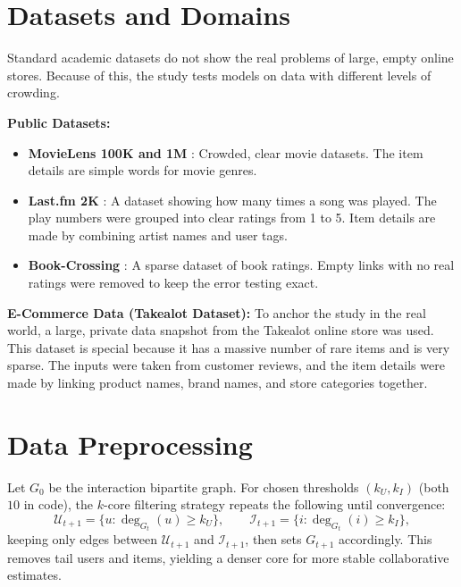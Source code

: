 \documentclass[11pt,a4paper]{report}
\begin{document}
\section{Datasets and Domains}
Standard academic datasets do not show the real problems of large, empty online stores. Because of this, the study tests models on data with different levels of crowding.

\textbf{Public Datasets:}
\begin{itemize}
    \item \textbf{MovieLens 100K and 1M} \citep{harper2015movielens}: Crowded, clear movie datasets. The item details are simple words for movie genres.
    \item \textbf{Last.fm 2K} \citep{cantador2011second}: A dataset showing how many times a song was played. The play numbers were grouped into clear ratings from 1 to 5. Item details are made by combining artist names and user tags.
    \item \textbf{Book-Crossing} \citep{ziegler2005improving}: A sparse dataset of book ratings. Empty links with no real ratings were removed to keep the error testing exact.
\end{itemize}

\textbf{E-Commerce Data (Takealot Dataset):}
To anchor the study in the real world, a large, private data snapshot from the Takealot online store was used. This dataset is special because it has a massive number of rare items and is very sparse. The inputs were taken from customer reviews, and the item details were made by linking product names, brand names, and store categories together.

\section{Data Preprocessing}
Let $G_0$ be the interaction bipartite graph. For chosen thresholds $(k_U,k_I)$ (both $10$ in code), the $k$-core filtering strategy repeats the following until convergence:
\begin{equation}
  \mathcal{U}_{t+1} = \bigl\{ u : \deg_{G_t}(u) \ge k_U \bigr\}, \qquad
  \mathcal{I}_{t+1} = \bigl\{ i : \deg_{G_t}(i) \ge k_I \bigr\},
\end{equation}
keeping only edges between $\mathcal{U}_{t+1}$ and $\mathcal{I}_{t+1}$, then sets $G_{t+1}$ accordingly. This removes tail users and items, yielding a denser core for more stable collaborative estimates.
\end{document}
